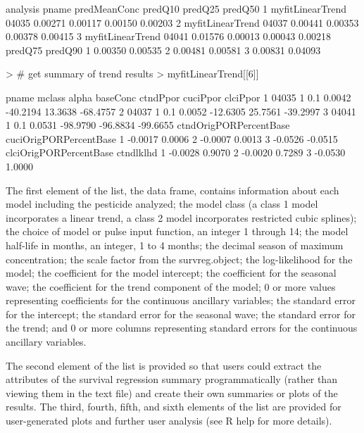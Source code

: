 \documentclass[11pt]{article}
\begin{document}
\begin{Schunk}
\begin{Soutput}
          analysis pname predMeanConc predQ10 predQ25 predQ50
1 myfitLinearTrend 04035      0.00271 0.00117 0.00150 0.00203
2 myfitLinearTrend 04037      0.00441 0.00353 0.00378 0.00415
3 myfitLinearTrend 04041      0.01576 0.00013 0.00043 0.00218
  predQ75 predQ90
1 0.00350 0.00535
2 0.00481 0.00581
3 0.00831 0.04093
\end{Soutput}
\begin{Sinput}
> # get summary of trend results
> myfitLinearTrend[[6]]
\end{Sinput}
\begin{Soutput}
  pname mclass alpha baseConc ctndPpor cuciPpor clciPpor
1 04035      1   0.1   0.0042 -40.2194  13.3638 -68.4757
2 04037      1   0.1   0.0052 -12.6305  25.7561 -39.2997
3 04041      1   0.1   0.0531 -98.9790 -96.8834 -99.6655
  ctndOrigPORPercentBase cuciOrigPORPercentBase
1                -0.0017                 0.0006
2                -0.0007                 0.0013
3                -0.0526                -0.0515
  clciOrigPORPercentBase ctndlklhd
1                -0.0028    0.9070
2                -0.0020    0.7289
3                -0.0530    1.0000
\end{Soutput}
\end{Schunk}
\vspace{5 mm}
The first element of the list, the data frame, contains information about each model including the pesticide analyzed; the model class (a class 1 model incorporates a linear trend, a class 2 model incorporates restricted cubic splines); the choice of model or pulse input function, an integer 1 through 14; the model half-life in months, an integer, 1 to 4 months; the decimal season of maximum concentration; the scale factor from the survreg.object; the log-likelihood for the model; the coefficient for the model intercept; the coefficient for the seasonal wave; the coefficient for the trend component of the model; 0 or more values representing coefficients for the continuous ancillary variables; the standard error for the intercept; the standard error for the seasonal wave; the standard error for the trend; and 0 or more columns representing standard errors for the continuous ancillary variables.

The second element of the list is provided so that users could extract the attributes of the survival regression summary programmatically (rather than viewing them in the text file) and create  their own summaries or plots of the results.  The third, fourth, fifth, and sixth elements of the list are provided for user-generated plots and further user analysis (see R help for more details).
\end{document}
